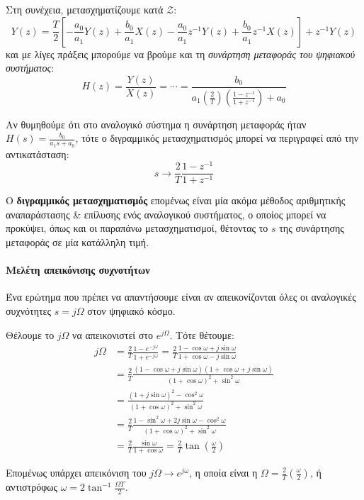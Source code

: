 \documentclass[11pt,a4paper,notitlepage,fleqn]{article}
\begin{document}
Στη συνέχεια, μετασχηματίζουμε κατά \( \mathcal{Z} \):
\[
Y(z) = \frac{T}{2}\left[
-\frac{a_0}{a_1}Y(z) + \frac{b_0}{a_1}X(z) - \frac{a_0}{a_1}z^{-1}Y(z) + \frac{b_0}{a_1}z^{-1}X(z)
\right] + z^{-1}Y(z)
\]
και με λίγες πράξεις μπορούμε να βρούμε και τη \emph{συνάρτηση μεταφοράς του ψηφιακού συστήματος}:
\[
H(z)=\frac{Y(z)}{X(z)} = \cdots = \frac{b_0}{a_1\left(\frac{2}{T}\right)\left(\frac{1-z^{-1}}{1+z^{-1}}\right)+a_0}
\]

Αν θυμηθούμε ότι στο αναλογικό σύστημα η συνάρτηση μεταφοράς ήταν \( H(s) = \frac{b_0}{a_1s+a_0} \),
τότε ο διγραμμικός μετασχηματισμός μπορεί να περιγραφεί από την αντικατάσταση:
\[
\boxed{s \to \frac{2}{T} \frac{1-z^{-1}}{1+z^{-1}}}
\]

Ο \textbf{διγραμμικός μετασχηματισμός} επομένως είναι μία ακόμα μέθοδος αριθμητικής αναπαράστασης \&
επίλυσης ενός αναλογικού συστήματος, ο οποίος μπορεί να προκύψει, όπως και οι παραπάνω μετασχηματισμοί,
θέτοντας το \( s \) της συνάρτησης μεταφοράς σε μία κατάλληλη τιμή.

\paragraph{Μελέτη απεικόνισης συχνοτήτων}
Ένα ερώτημα που πρέπει να απαντήσουμε είναι αν απεικονίζονται όλες οι αναλογικές συχνότητες \( s=jΩ \)
στον ψηφιακό κόσμο.

Θέλουμε το \( j\Omega \) να απεικονιστεί στο \( e^{j\Omega} \). Τότε θέτουμε:
\begin{align*}
	jΩ &= \frac{2}{T} \frac{1-e^{-j\omega }}{1+e^{-j\omega }} = \frac{2}{T} \frac{1-\cos \omega +j\sin \omega}{1+\cos \omega - j \sin \omega}
	\\ &= \frac{2}{T} \frac{
	(1-\cos \omega + j\sin \omega)(1+\cos \omega + j \sin \omega)
    }{(1+\cos \omega)^2 + \sin^2 \omega}
    \\ &= \frac{(1+j\sin \omega)^2 - \cos^2\omega}{(1+\cos\omega)^2 + \sin^2\omega}
    \\ &= \frac{2}{T} \frac{1-\sin^2\omega + 2j\sin\omega - \cos^2\omega}{(1+\cos\omega)^2 + \sin^2\omega}
    \\ &= \frac{2}{T} \frac{\sin\omega}{1+\cos \omega} = \frac{2}{T} \tan\left(\frac{\omega}{2}\right)
\end{align*}

Επομένως υπάρχει απεικόνιση του \( j\Omega \to e^{j\omega} \), η οποία είναι η \( \Omega = \frac{2}{T}\left(\frac{\omega}{2}\right) \), ή αντιστρόφως \( \omega = 2\tan^{-1}\frac{\Omega T}{2} \).
\end{document}
